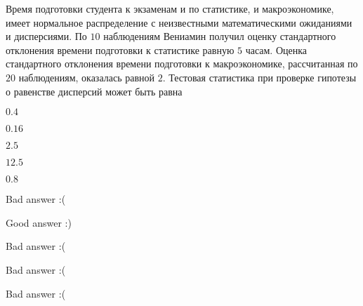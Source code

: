 
\begin{question}
Время подготовки студента к экзаменам и по статистике, и макроэкономике,
имеет нормальное распределение с неизвестными математическими ожиданиями
и дисперсиями. По \(10\) наблюдениям Вениамин получил оценку
стандартного отклонения времени подготовки к статистике равную \(5\)
часам. Оценка стандартного отклонения времени подготовки к
макроэкономике, рассчитанная по \(20\) наблюдениям, оказалась равной
\(2\). Тестовая статистика при проверке гипотезы о равенстве дисперсий
может быть равна
\begin{answerlist}
  \item \(0.4\)
  \item \(0.16\)
  \item \(2.5\)
  \item \(12.5\)
  \item \(0.8\)
\end{answerlist}
\end{question}

\begin{solution}
\begin{answerlist}
  \item Bad answer :(
  \item Good answer :)
  \item Bad answer :(
  \item Bad answer :(
  \item Bad answer :(
\end{answerlist}
\end{solution}

